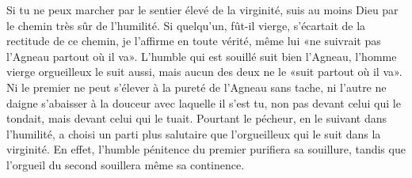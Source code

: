 Si tu ne peux marcher par le sentier élevé de la virginité,
	suis au moins Dieu par le chemin très sûr de l'humilité.
Si quelqu'un, fût-il vierge, s'écartait de la rectitude de ce chemin,
	je l'affirme en toute vérité,
	même lui «ne suivrait pas l'Agneau partout où il va».
L'humble qui est souillé suit bien l'Agneau,
	l'homme vierge orgueilleux le suit aussi,
	mais aucun des deux ne le «suit partout où il va».
Ni le premier ne peut s'élever à la pureté de l'Agneau sans tache,
	ni l'autre ne daigne s'abaisser à la douceur avec laquelle il s'est tu,
	non pas devant celui qui le tondait, mais devant celui qui le tuait.
Pourtant le pécheur, en le suivant dans l'humilité,
	a choisi un parti plus salutaire que l'orgueilleux qui le suit dans la virginité.
En effet, l'humble pénitence du premier purifiera sa souillure,
	tandis que l'orgueil du second souillera même sa continence.
